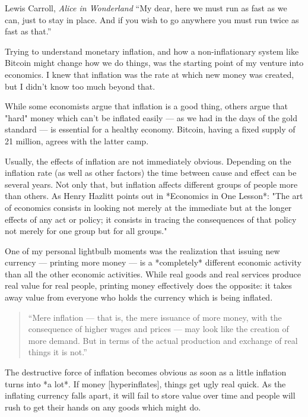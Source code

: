 \label{les:9}

\begin{chapquote}{Lewis Carroll, \textit{Alice in Wonderland}}
``My dear, here we must run as fast as we can, just to stay in place. And if you
wish to go anywhere you must run twice as fast as that.''
\end{chapquote}

Trying to understand monetary inflation, and how a non-inflationary
system like Bitcoin might change how we do things, was the starting
point of my venture into economics. I knew that inflation was the rate
at which new money was created, but I didn't know too much beyond that.

While some economists argue that inflation is a good thing, others argue
that "hard" money which can't be inflated easily --- as we had in the
days of the gold standard --- is essential for a healthy economy.
Bitcoin, having a fixed supply of 21 million, agrees with the latter
camp.

Usually, the effects of inflation are not immediately obvious. Depending
on the inflation rate (as well as other factors) the time between cause
and effect can be several years. Not only that, but inflation affects
different groups of people more than others. As Henry Hazlitt points out
in *Economics in One Lesson*: "The art of economics consists in looking
not merely at the immediate but at the longer effects of any act or
policy; it consists in tracing the consequences of that policy not
merely for one group but for all groups."

One of my personal lightbulb moments was the realization that issuing
new currency --- printing more money --- is a *completely* different
economic activity than all the other economic activities. While real
goods and real services produce real value for real people, printing
money effectively does the opposite: it takes away value from everyone
who holds the currency which is being inflated.

\begin{quotation}
``Mere inflation --- that is, the mere issuance of more money, with the
consequence of higher wages and prices --- may look like the creation
of more demand. But in terms of the actual production and exchange of
real things it is not.''
\end{quotation}

The destructive force of inflation becomes obvious as soon as a little
inflation turns into *a lot*. If money [hyperinflates], things get ugly
real quick. As the inflating currency falls apart, it will fail to store
value over time and people will rush to get their hands on any goods
which might do.

